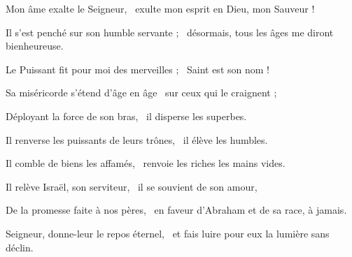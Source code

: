 \item Mon âme exalte le Seigneur,~\psstar{} exulte mon esprit en Dieu, mon Sauveur !

\item Il s'est penché sur son humble servante ;~\psstar{} désormais, tous les âges me diront bienheureuse.

\item Le Puissant fit pour moi des merveilles ;~\psstar{} Saint est son nom !

\item Sa miséricorde s'étend d'âge en âge~\psstar{} sur ceux qui le craignent ;

\item Déployant la force de son bras,~\psstar{} il disperse les superbes.

\item Il renverse les puissants de leurs trônes,~\psstar{} il élève les humbles.

\item Il comble de biens les affamés,~\psstar{} renvoie les riches les mains vides.

\item Il relève Israël, son serviteur,~\psstar{} il se souvient de son amour,

\item De la promesse faite à nos pères,~\psstar{} en faveur d'Abraham et de sa race, à jamais.

\item Seigneur, donne-leur le repos éternel,~\psstar{} et fais luire pour eux la lumière sans déclin.